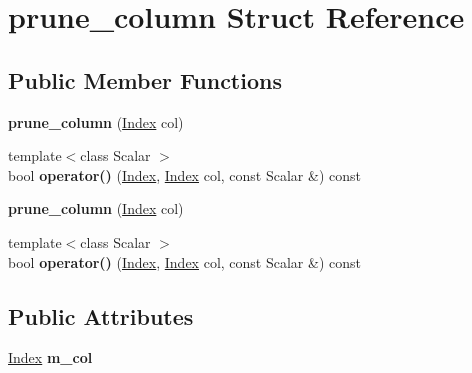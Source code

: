 \hypertarget{structprune__column}{}\section{prune\+\_\+column Struct Reference}
\label{structprune__column}
\subsection*{Public Member Functions}
\begin{DoxyCompactItemize}
\item 
\mbox{\label{structprune__column_a90827c1f1498298114fee4b1fee83e80}} 
{\bfseries prune\+\_\+column} (\hyperlink{namespace_eigen_a62e77e0933482dafde8fe197d9a2cfde}{Index} col)
\item 
\mbox{\label{structprune__column_a87671de949eab1099a614e2b6a6c4c23}} 
{\footnotesize template$<$class Scalar $>$ }\\bool {\bfseries operator()} (\hyperlink{namespace_eigen_a62e77e0933482dafde8fe197d9a2cfde}{Index}, \hyperlink{namespace_eigen_a62e77e0933482dafde8fe197d9a2cfde}{Index} col, const Scalar \&) const
\item 
\mbox{\label{structprune__column_a90827c1f1498298114fee4b1fee83e80}} 
{\bfseries prune\+\_\+column} (\hyperlink{namespace_eigen_a62e77e0933482dafde8fe197d9a2cfde}{Index} col)
\item 
\mbox{\label{structprune__column_a87671de949eab1099a614e2b6a6c4c23}} 
{\footnotesize template$<$class Scalar $>$ }\\bool {\bfseries operator()} (\hyperlink{namespace_eigen_a62e77e0933482dafde8fe197d9a2cfde}{Index}, \hyperlink{namespace_eigen_a62e77e0933482dafde8fe197d9a2cfde}{Index} col, const Scalar \&) const
\end{DoxyCompactItemize}
\subsection*{Public Attributes}
\begin{DoxyCompactItemize}
\item 
\mbox{\label{structprune__column_a2a1dd613323a26eb4806ecf9d9bcc3cf}} 
\hyperlink{namespace_eigen_a62e77e0933482dafde8fe197d9a2cfde}{Index} {\bfseries m\+\_\+col}
\end{DoxyCompactItemize}


